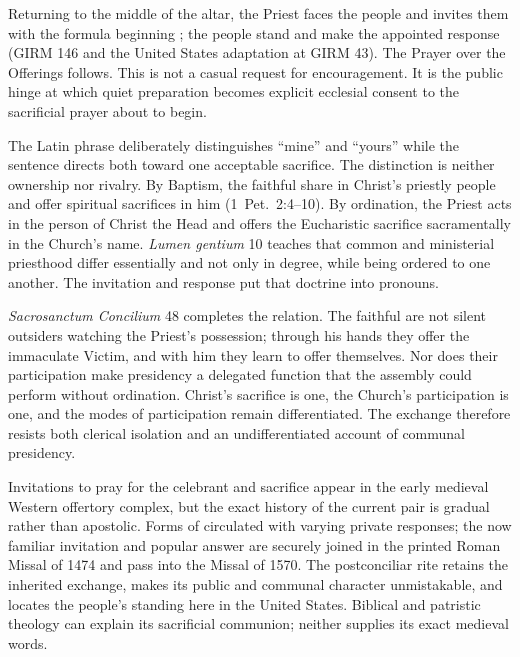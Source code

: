 
Returning to the middle of the altar, the Priest faces the people and invites them with the formula beginning ; the people stand and make the appointed response (GIRM 146 and the United States adaptation at GIRM 43). The Prayer over the Offerings follows. This is not a casual request for encouragement. It is the public hinge at which quiet preparation becomes explicit ecclesial consent to the sacrificial prayer about to begin.

The Latin phrase  deliberately distinguishes ``mine'' and ``yours'' while the sentence directs both toward one acceptable sacrifice. The distinction is neither ownership nor rivalry. By Baptism, the faithful share in Christ's priestly people and offer spiritual sacrifices in him (1~Pet.~2:4--10). By ordination, the Priest acts in the person of Christ the Head and offers the Eucharistic sacrifice sacramentally in the Church's name. \emph{Lumen gentium} 10 teaches that common and ministerial priesthood differ essentially and not only in degree, while being ordered to one another. The invitation and response put that doctrine into pronouns.

\emph{Sacrosanctum Concilium} 48 completes the relation. The faithful are not silent outsiders watching the Priest's possession; through his hands they offer the immaculate Victim, and with him they learn to offer themselves. Nor does their participation make presidency a delegated function that the assembly could perform without ordination. Christ's sacrifice is one, the Church's participation is one, and the modes of participation remain differentiated. The exchange therefore resists both clerical isolation and an undifferentiated account of communal presidency.

Invitations to pray for the celebrant and sacrifice appear in the early medieval Western offertory complex, but the exact history of the current pair is gradual rather than apostolic. Forms of  circulated with varying private responses; the now familiar invitation and popular answer are securely joined in the printed Roman Missal of 1474 and pass into the Missal of 1570. The postconciliar rite retains the inherited exchange, makes its public and communal character unmistakable, and locates the people's standing here in the United States. Biblical and patristic theology can explain its sacrificial communion; neither supplies its exact medieval words.

